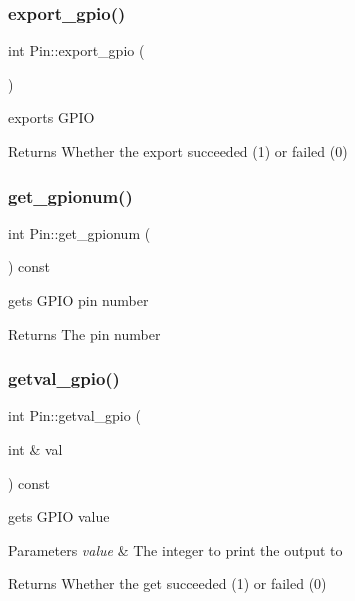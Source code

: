 \subsubsection{\texorpdfstring{export\+\_\+gpio()}{export\_gpio()}}
{\footnotesize\ttfamily int Pin\+::export\+\_\+gpio (\begin{DoxyParamCaption}{ }\end{DoxyParamCaption})}



exports G\+P\+IO 

\begin{DoxyReturn}{Returns}
Whether the export succeeded (1) or failed (0) 
\end{DoxyReturn}
\mbox{\label{classPin_a180d487895b4fc270437af97a0428f22}} 
\subsubsection{\texorpdfstring{get\+\_\+gpionum()}{get\_gpionum()}}
{\footnotesize\ttfamily int Pin\+::get\+\_\+gpionum (\begin{DoxyParamCaption}{ }\end{DoxyParamCaption}) const}



gets G\+P\+IO pin number 

\begin{DoxyReturn}{Returns}
The pin number 
\end{DoxyReturn}
\mbox{\label{classPin_a04fc4921bf674049be0d06842709913f}} 
\subsubsection{\texorpdfstring{getval\+\_\+gpio()}{getval\_gpio()}}
{\footnotesize\ttfamily int Pin\+::getval\+\_\+gpio (\begin{DoxyParamCaption}\item[{int \&}]{val }\end{DoxyParamCaption}) const}



gets G\+P\+IO value 


\begin{DoxyParams}{Parameters}
{\em value} & The integer to print the output to \\
\hline
\end{DoxyParams}
\begin{DoxyReturn}{Returns}
Whether the get succeeded (1) or failed (0) 
\end{DoxyReturn}
\mbox{\label{classPin_a40c6f300d3c97b653fb598ca36a8d778}} 
